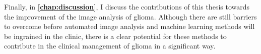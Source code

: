 Finally, in \textbf{\cref{chap:discussion}}, I discuss the contributions of this thesis towards the improvement of the image analysis of glioma.
Although there are still barriers to overcome before automated image analysis and machine learning methods will be ingrained in the clinic, there is a clear potential for these methods to contribute in the clinical management of glioma in a significant way.
